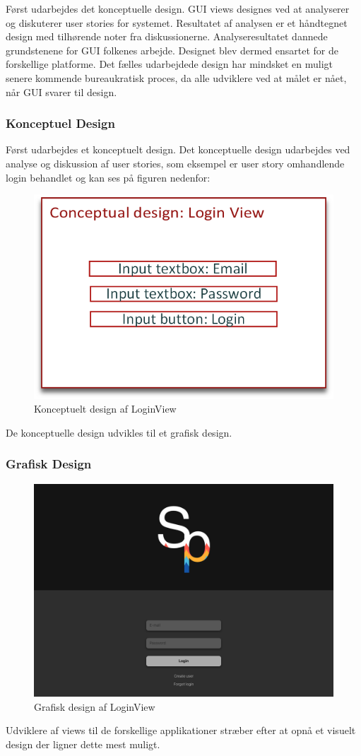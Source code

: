 Først udarbejdes det konceptuelle design. GUI views designes ved at analyserer og diskuterer user stories for systemet. Resultatet af analysen er et håndtegnet design med tilhørende noter fra diskussionerne. Analyseresultatet dannede grundstenene for GUI folkenes arbejde. Designet blev dermed ensartet for de forskellige platforme. Det fælles udarbejdede design har mindsket en muligt senere kommende bureaukratisk proces, da alle udviklere ved at målet er nået, når GUI svarer til design. 

\subsubsection{Konceptuel Design}
Først udarbejdes et konceptuelt design. Det konceptuelle design udarbejdes ved analyse og diskussion af user stories, som eksempel er user story omhandlende login behandlet og kan ses på figuren nedenfor:

\begin{figure}
	\centering
	\includegraphics[width=0.5\linewidth]{figs/design/concuptuel_design_loginview}
	\caption{Konceptuelt design af LoginView}
	\label{fig:conceptualdesignview}
\end{figure}

De konceptuelle design udvikles til et grafisk design.
\subsubsection{Grafisk Design}
\begin{figure}
	\centering
	\includegraphics[width=0.5\linewidth]{figs/design/DesktopHDLogin}
	\caption{Grafisk design af LoginView}
	\label{fig:graphicaldesign}
\end{figure}
Udviklere af views til de forskellige applikationer stræber efter at opnå et visuelt design der ligner dette mest muligt.